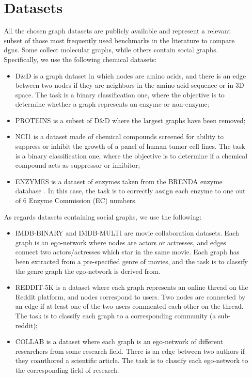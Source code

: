 \section{Datasets}\label{sec:comparison-datasets}
All the chosen graph  datasets are  publicly  available \citep{kersting2016benchmark}  and  represent  a  relevant subset of those most frequently used benchmarks in the literature to compare \glspl{dgn}. Some collect molecular graphs, while others contain social graphs. Specifically, we use the following chemical datasets:
\begin{itemize}
    \item D\&D \citep{dobson2003dd} is a graph dataset in which nodes are amino acids, and there is an edge between two nodes if they are neighbors in the amino-acid sequence or in 3D space. The task is a binary classification one, where the objective is to determine whether a graph represents an enzyme or non-enzyme;
    \item PROTEINS \citep{borgwardt2005proteins} is a subset of D\&D where the largest graphs have been removed;
    \item NCI1 \citep{wale2008nci1} is a dataset made of chemical compounds screened for ability to suppress or inhibit the growth of a panel of human tumor cell lines. The task is a binary classification one, where the objective is to determine if a chemical compound acts as suppressor or inhibitor;
    \item ENZYMES is a dataset of enzymes taken from the BRENDA enzyme database \citep{schomburg2004enzymes}. In this case, the task is to correctly assign each enzyme to one out of 6 Enzyme Commission (EC) numbers.
\end{itemize}
As regards datasets containing social graphs, we use the following:
\begin{itemize}
    \item IMDB-BINARY and IMDB-MULTI \citep{yanardag2015imdbredditcollab} are movie collaboration datasets. Each graph is an ego-network where nodes are actors or actresses, and edges connect two actors/actresses which star in the same movie. Each graph has been extracted from a pre-specified genre of movies, and the task is to classify the genre graph the ego-network is derived from.
    \item REDDIT-5K \citep{yanardag2015imdbredditcollab} is a dataset where each graph represents an online thread on the Reddit platform, and nodes correspond to users. Two nodes are connected by an edge if at least one of the two users commented each other on the thread. The task is to classify each graph to a corresponding community (a sub-reddit);
    \item COLLAB \citep{yanardag2015imdbredditcollab} is a dataset where each graph is an ego-network of different researchers from some research field. There is an edge between two authors if they coauthored a scientific article. The task is to classify each ego-network to the corresponding field of research.
\end{itemize}
